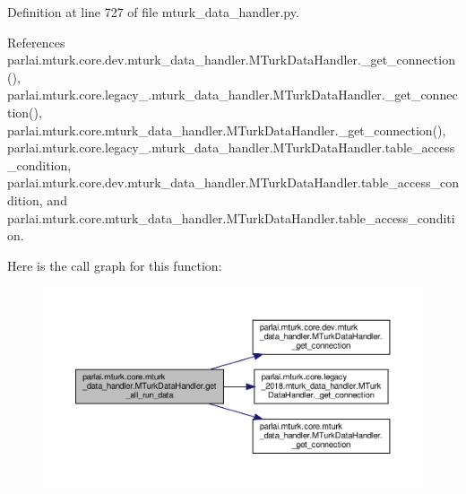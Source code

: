 Definition at line 727 of file mturk\+\_\+data\+\_\+handler.\+py.



References parlai.\+mturk.\+core.\+dev.\+mturk\+\_\+data\+\_\+handler.\+M\+Turk\+Data\+Handler.\+\_\+get\+\_\+connection(), parlai.\+mturk.\+core.\+legacy\+\_.\+mturk\+\_\+data\+\_\+handler.\+M\+Turk\+Data\+Handler.\+\_\+get\+\_\+connection(), parlai.\+mturk.\+core.\+mturk\+\_\+data\+\_\+handler.\+M\+Turk\+Data\+Handler.\+\_\+get\+\_\+connection(), parlai.\+mturk.\+core.\+legacy\+\_.\+mturk\+\_\+data\+\_\+handler.\+M\+Turk\+Data\+Handler.\+table\+\_\+access\+\_\+condition, parlai.\+mturk.\+core.\+dev.\+mturk\+\_\+data\+\_\+handler.\+M\+Turk\+Data\+Handler.\+table\+\_\+access\+\_\+condition, and parlai.\+mturk.\+core.\+mturk\+\_\+data\+\_\+handler.\+M\+Turk\+Data\+Handler.\+table\+\_\+access\+\_\+condition.

Here is the call graph for this function\+:
\nopagebreak
\begin{figure}[H]
\begin{center}
\leavevmode
\includegraphics[width=350pt]{classparlai_1_1mturk_1_1core_1_1mturk__data__handler_1_1MTurkDataHandler_a260b4003fe27797a7e49547db992d06e_cgraph}
\end{center}
\end{figure}
\mbox{\label{classparlai_1_1mturk_1_1core_1_1mturk__data__handler_1_1MTurkDataHandler_a6ad4b37c9393559d29d7e0e7a1b93027}} 
